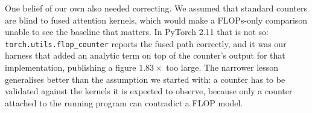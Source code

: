 One belief of our own also needed correcting. We assumed that standard counters
are blind to fused attention kernels, which would make a FLOPs-only comparison
unable to see the baseline that matters. In PyTorch 2.11 that is not so:
\texttt{torch.utils.flop\_counter} reports the fused path correctly, and it was
our harness that added an analytic term on top of the counter's output for that
implementation, publishing a figure $1.83\times$ too large. The narrower lesson
generalises better than the assumption we started with: a counter has to be validated
against the kernels it is expected to observe, because only a counter attached
to the running program can contradict a FLOP model.
